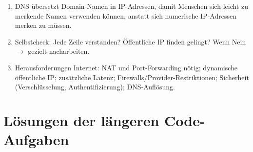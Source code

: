 \begin{myexercise}
\begin{myanswer}
\begin{enumerate}
            \item DNS übersetzt Domain-Namen in IP-Adressen, damit Menschen sich leicht zu merkende Namen verwenden können, anstatt sich numerische IP-Adressen merken zu müssen.
            \item Selbstcheck: Jede Zeile verstanden? Öffentliche IP finden gelingt? Wenn Nein $\rightarrow$ gezielt nacharbeiten.
            \item Herausforderungen Internet: NAT und Port-Forwarding nötig; dynamische öffentliche IP; zusätzliche Latenz; Firewalls/Provider-Restriktionen; Sicherheit (Verschlüsselung, Authentifizierung); DNS-Auflösung.
        \end{enumerate}
    \end{myanswer}
\end{myexercise}

\clearpage
\section{Lösungen der längeren Code-Aufgaben}\label{sec:loesungen-chat}
\begin{myanswer}
    
    
\end{myanswer}
\newpage
\begin{myanswer}
    
    
\end{myanswer}
\newpage
\begin{myanswer}
    
    
\end{myanswer}

\begin{myanswer}
    

    
\end{myanswer}

\begin{myanswer}
    

    
\end{myanswer}